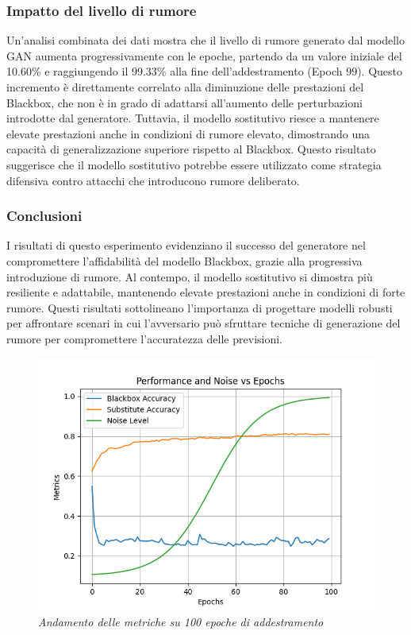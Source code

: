 \subsubsection{Impatto del livello di rumore}
Un'analisi combinata dei dati mostra che il livello di rumore generato dal modello GAN aumenta progressivamente con le epoche, partendo da un valore iniziale del 10.60\% e raggiungendo il 99.33\% alla fine dell'addestramento (Epoch 99). Questo incremento è direttamente correlato alla diminuzione delle prestazioni del Blackbox, che non è in grado di adattarsi all'aumento delle perturbazioni introdotte dal generatore.
Tuttavia, il modello sostitutivo riesce a mantenere elevate prestazioni anche in condizioni di rumore elevato, dimostrando una capacità di generalizzazione superiore rispetto al Blackbox. Questo risultato suggerisce che il modello sostitutivo potrebbe essere utilizzato come strategia difensiva contro attacchi che introducono rumore deliberato.
\subsubsection{Conclusioni}
I risultati di questo esperimento evidenziano il successo del generatore nel compromettere l'affidabilità del modello Blackbox, grazie alla progressiva introduzione di rumore. Al contempo, il modello sostitutivo si dimostra più resiliente e adattabile, mantenendo elevate prestazioni anche in condizioni di forte rumore. Questi risultati sottolineano l'importanza di progettare modelli robusti per affrontare scenari in cui l'avversario può sfruttare tecniche di generazione del rumore per compromettere l'accuratezza delle previsioni.
\begin{figure}[ht]
    \centering
        \centering
        \includegraphics[width=0.8\linewidth]{images/graph_100_epochs.png}
        \caption{\emph{Andamento delle metriche su 100 epoche di addestramento}}
        \label{fig:graph_100_epochs}
\end{figure}

